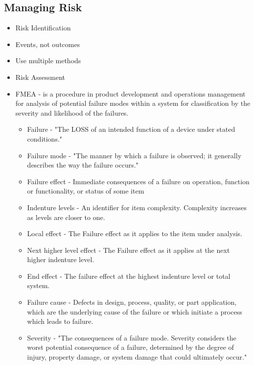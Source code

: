 \documentclass[8pt, letter]{extarticle}
\begin{document}
\begin{multicols}{2}
    \subsection{Managing Risk}
    \begin{itemize}
        \item Risk Identification
        \item Events, not outcomes
        \item Use multiple methods
        \item Risk Assessment
        \item FMEA - is a procedure in product development and operations management for analysis of potential failure modes within a system for classification by the severity and likelihood of the failures.
            \begin{itemize}
                \item Failure - "The LOSS of an intended function of a device under stated conditions."
                \item Failure mode - "The manner by which a failure is observed; it generally describes the way the failure occurs."
                \item Failure effect - Immediate consequences of a failure on operation, function or functionality, or status of some item
                \item Indenture levels - An identifier for item complexity. Complexity increases as levels are closer to one.
                \item Local effect - The Failure effect as it applies to the item under analysis.
                \item Next higher level effect - The Failure effect as it applies at the next higher indenture level.
                \item End effect - The failure effect at the highest indenture level or total system.
                \item Failure cause - Defects in design, process, quality, or part application, which are the underlying cause of the failure or which initiate a process which leads to failure.
                \item Severity - "The consequences of a failure mode. Severity considers the worst potential consequence of a failure, determined by the degree of injury, property damage, or system damage that could ultimately occur." 
            \end{itemize}


\end{itemize}
\end{multicols}
\end{document}
